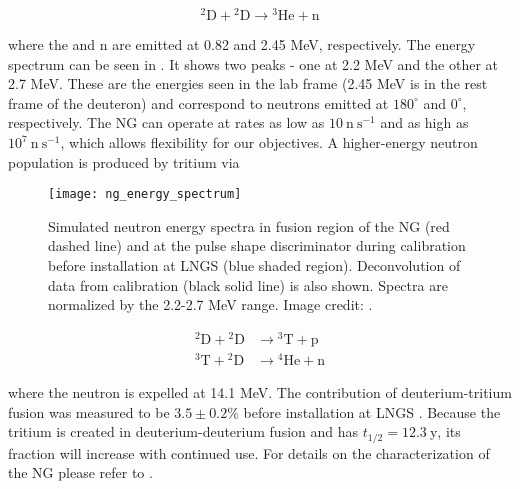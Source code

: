 \begin{equation}
\mathrm{^{2}D} + \mathrm{^{2}D} \rightarrow \mathrm{^{3}He} + \mathrm{n}
\end{equation}

\noindent where the  and n are emitted at 0.82 and 2.45 MeV, respectively.  The energy spectrum can be seen in
.  It shows two peaks - one at 2.2 MeV and the other at 2.7 MeV.  These
are the energies seen in the lab frame (2.45 MeV is in the rest frame of the deuteron) and correspond to neutrons emitted at $180^{\circ}$
and $0^{\circ}$, respectively.  The NG can operate at rates as low as $10\ \mathrm{n\ s^{-1}}$
and as high as $10^7\ \mathrm{n\ s^{-1}}$, which allows flexibility for our objectives.  A higher-energy neutron
population is produced by tritium via

\begin{figure}
\centering
\texttt{[image: ng\_energy\_spectrum]}
\caption[Simulated neutron energy spectra in fusion region of the NG and at the pulse shape discriminator during
calibration before installation at LNGS.]{Simulated neutron energy spectra in fusion region of the NG (red dashed line) and at the pulse
shape discriminator during
calibration before installation at LNGS (blue shaded region).  Deconvolution of data from calibration (black solid line) is also
shown.  Spectra are normalized by the 2.2-2.7 MeV range.  Image credit: .}
\label{fig:er_nr_calibrations_parameter_determ_nr_ng_energy}
\end{figure}

\vspace{-30pt}

\begin{subequations}
\begin{align}
\mathrm{^{2}D} + \mathrm{^{2}D} &\rightarrow \mathrm{^{3}T} + \mathrm{p} \\
\mathrm{^{3}T} + \mathrm{^{2}D} &\rightarrow \mathrm{^{4}He} + \mathrm{n}
\end{align}
\end{subequations}

\vspace{-10pt}

\noindent where the neutron is expelled at 14.1 MeV.  The contribution of deuterium-tritium fusion was measured to be $3.5 \pm 0.2\%$
before installation at LNGS .  Because the tritium is created in deuterium-deuterium fusion and has
$t_{1/2} = 12.3\ \mathrm{y}$, its fraction will increase with continued use.  For details on the characterization of the NG
please refer to .

